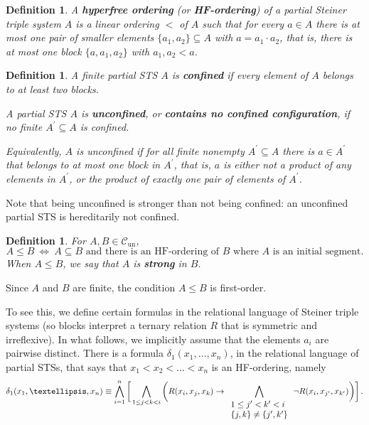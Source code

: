 \documentclass[10pt,a4paper]{article}
\newcommand{\Cun}{\mathcal{C}_\mathrm{un}}
\theoremstyle{note}
\newtheorem{df}[thm]{Definition}
\begin{document}
	\begin{df} A \textbf{hyperfree ordering}  (or \textbf{HF-ordering}) of a partial Steiner triple system  $A$ is a linear ordering $<$ of $A$ such that for every $a\in A$ there is at most one pair of smaller elements $\{a_1,a_2\}\subseteq A$ with $a=a_1\cdot a_2$,  that is, there is at most one block $\{a,a_1,a_2\}$ with $a_1,a_2<a$.
	\end{df}

				\begin{df} %
 A finite partial STS  $A$ is \textbf{confined} if every element of $A$ belongs to at least two blocks.

A partial STS %
 $A$ is \textbf{unconfined}, or \textbf{contains no confined configuration}, if no finite $A^\prime \subseteq A$ is confined.

Equivalently,  $A$ is unconfined if for all finite  nonempty $A^\prime \subseteq A$ there is $a \in A^\prime$ that belongs to at most one block in $A^\prime$, that is, $a$ is either not a product of any elements in $A^\prime$, or the product of exactly one pair of elements of $A^\prime$.
\end{df}
Note that being unconfined is stronger than not being confined: an unconfined partial STS is hereditarily not confined. 

	\begin{df} \label{def5_1} For $A, B \in \Cun$,
$$A \leq B \  \Leftrightarrow \ A\subseteq B \mbox{ and there is an HF-ordering of $B$ where $A$ is an initial segment}. $$
When $A \leq B$, we say that $A$ is \textbf{strong} in $B$.
\end{df}

Since $A$ and $B$ are finite, the condition $A \leq B$ is first-order.

To see this, we define certain formulas in the relational language of Steiner triple systems (so blocks interpret a ternary relation $R$ that is symmetric and irreflexive). In what follows, we implicitly assume that the elements $a_i$ are pairwise distinct. There is a formula $\delta_1(x_1, \ldots, x_n)$, in the relational language of partial STSs, that says that $x_1<x_2<\ldots <x_n$ is an HF-ordering, namely
$$\delta_1(x_1, \ldots, x_n) \equiv \bigwedge_{i=1}^n \bigg[ \bigwedge_{1\leq j <k<i} \bigg( R(x_i, x_j, x_k) \rightarrow \bigwedge_{\tiny \begin{array}{l} 1\leq j' <k'<i \\ \{j,k\} \neq \{j',k'\} \end{array}} \neg R(x_i,x_{j'},x_{k'}) \bigg) \bigg] \, .$$
\end{document}
